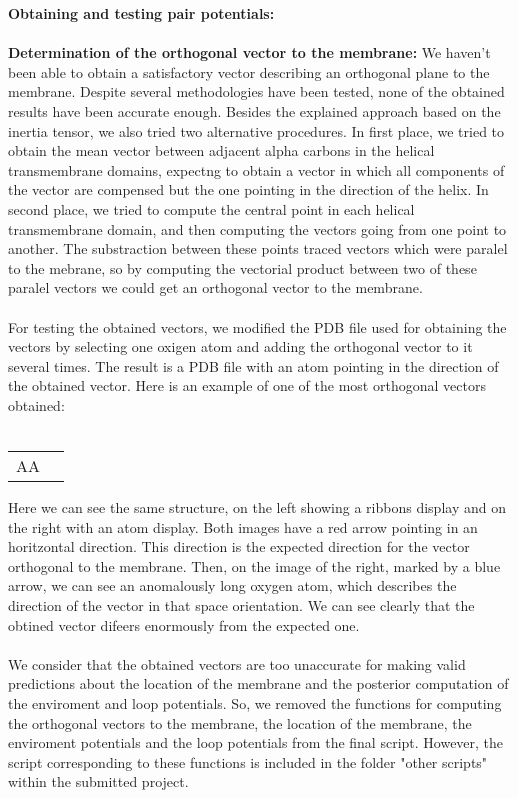 \documentclass[12pt,titlepage]{article}
\theoremstyle{supercalifragilisticexpialidocious}
\begin{document}
\textbf{Obtaining and testing pair potentials: }
\\ \\
\textbf{Determination of the orthogonal vector to the membrane: } We haven't been able to obtain a satisfactory vector describing an orthogonal plane to the membrane. Despite several methodologies have been tested, none of the obtained results have been accurate enough. Besides the explained approach based on the inertia tensor, we also tried two alternative procedures. In first place, we tried to obtain the mean vector between adjacent alpha carbons in the helical transmembrane domains, expectng to obtain a vector in which all components of the vector are compensed but the one pointing in the direction of the helix. In second place, we tried to compute the central point in each helical transmembrane domain, and then computing the vectors going from one point to another. The substraction between these points traced vectors which were paralel to the mebrane, so by computing the vectorial product between two of these paralel vectors we could get an orthogonal vector to the membrane.
\\ \\
For testing the obtained vectors, we modified the PDB file used for obtaining the vectors by selecting one oxigen atom and adding the orthogonal vector to it several times. The result is a PDB file with an atom pointing in the direction of the obtained vector. Here is an example of one of the most orthogonal vectors obtained:
\\ \\
\begin{center}
\begin{tabular}{c c}
AA%
\end{tabular}
\end{center}

Here we can see the same structure, on the left showing a ribbons display and on the right with an atom display. Both images have a red arrow pointing in an horitzontal direction. This direction is the expected direction for the vector orthogonal to the membrane. Then, on the image of the right, marked by a blue arrow, we can see an anomalously long oxygen atom, which describes the direction of the vector in that space orientation. We can see clearly that the obtined vector difeers enormously from the expected one. 
\\ \\
We consider that the obtained vectors are too unaccurate for making valid predictions about the location of the membrane and the posterior computation of the enviroment and loop potentials. So, we removed the functions for computing the orthogonal vectors to the membrane, the location of the membrane, the enviroment potentials and the loop potentials from the final script. However, the script corresponding to these functions is included in the folder "other scripts" within the submitted project. 
\end{document}
